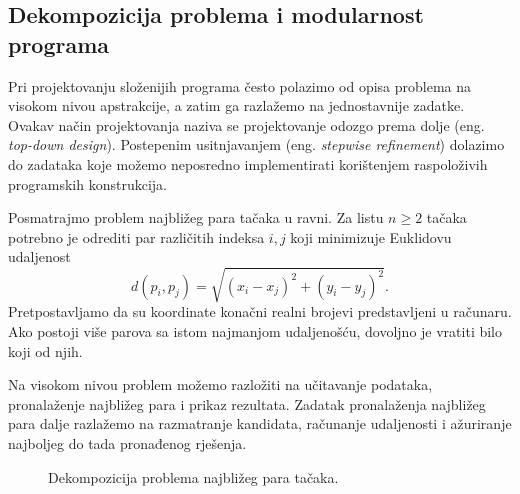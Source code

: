 \subsection{Dekompozicija problema i modularnost programa}

Pri projektovanju složenijih programa često polazimo od opisa problema na visokom nivou apstrakcije, a zatim ga razlažemo na jednostavnije zadatke. Ovakav način projektovanja naziva se projektovanje odozgo prema dolje (eng. \textit{top-down design}). Postepenim usitnjavanjem (eng. \textit{stepwise refinement}) dolazimo do zadataka koje možemo neposredno implementirati korištenjem raspoloživih programskih konstrukcija.

Posmatrajmo problem najbližeg para tačaka u ravni. Za listu $n\geq 2$ tačaka potrebno je odrediti par različitih indeksa $i,j$ koji minimizuje Euklidovu udaljenost
\[
d(p_i,p_j)=\sqrt{(x_i-x_j)^2+(y_i-y_j)^2}.
\]
Pretpostavljamo da su koordinate konačni realni brojevi predstavljeni u računaru. Ako postoji više parova sa istom najmanjom udaljenošću, dovoljno je vratiti bilo koji od njih.

Na visokom nivou problem možemo razložiti na učitavanje podataka, pronalaženje najbližeg para i prikaz rezultata. Zadatak pronalaženja najbližeg para dalje razlažemo na razmatranje kandidata, računanje udaljenosti i ažuriranje najboljeg do tada pronađenog rješenja.

\begin{figure}[H]
\centering
{}
\caption{Dekompozicija problema najbližeg para tačaka.}
\label{fig:proceduralna-dekompozicija}
\end{figure}

